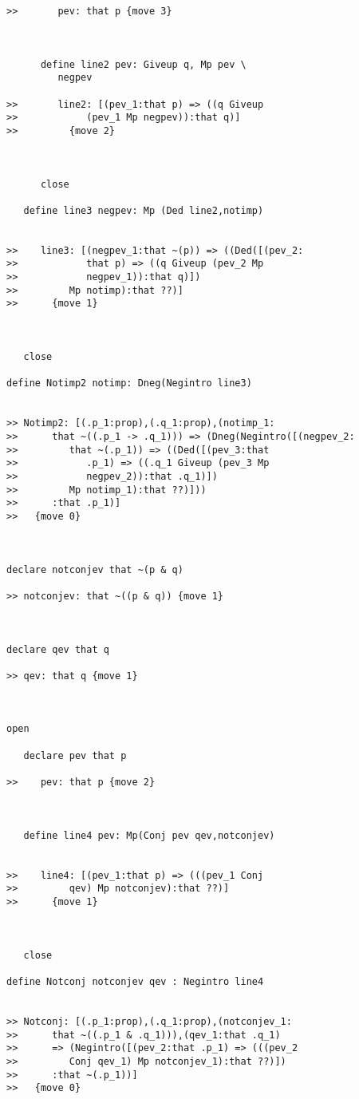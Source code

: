 \documentclass[12pt]{article}
\begin{document}
\begin{verbatim}
>>       pev: that p {move 3}



      define line2 pev: Giveup q, Mp pev \
         negpev

>>       line2: [(pev_1:that p) => ((q Giveup
>>            (pev_1 Mp negpev)):that q)]
>>         {move 2}



      close

   define line3 negpev: Mp (Ded line2,notimp)


>>    line3: [(negpev_1:that ~(p)) => ((Ded([(pev_2:
>>            that p) => ((q Giveup (pev_2 Mp
>>            negpev_1)):that q)])
>>         Mp notimp):that ??)]
>>      {move 1}



   close

define Notimp2 notimp: Dneg(Negintro line3)


>> Notimp2: [(.p_1:prop),(.q_1:prop),(notimp_1:
>>      that ~((.p_1 -> .q_1))) => (Dneg(Negintro([(negpev_2:
>>         that ~(.p_1)) => ((Ded([(pev_3:that
>>            .p_1) => ((.q_1 Giveup (pev_3 Mp
>>            negpev_2)):that .q_1)])
>>         Mp notimp_1):that ??)]))
>>      :that .p_1)]
>>   {move 0}



declare notconjev that ~(p & q)

>> notconjev: that ~((p & q)) {move 1}



declare qev that q

>> qev: that q {move 1}



open

   declare pev that p

>>    pev: that p {move 2}



   define line4 pev: Mp(Conj pev qev,notconjev)


>>    line4: [(pev_1:that p) => (((pev_1 Conj
>>         qev) Mp notconjev):that ??)]
>>      {move 1}



   close

define Notconj notconjev qev : Negintro line4


>> Notconj: [(.p_1:prop),(.q_1:prop),(notconjev_1:
>>      that ~((.p_1 & .q_1))),(qev_1:that .q_1)
>>      => (Negintro([(pev_2:that .p_1) => (((pev_2
>>         Conj qev_1) Mp notconjev_1):that ??)])
>>      :that ~(.p_1))]
>>   {move 0}


\end{verbatim}
\end{document}
